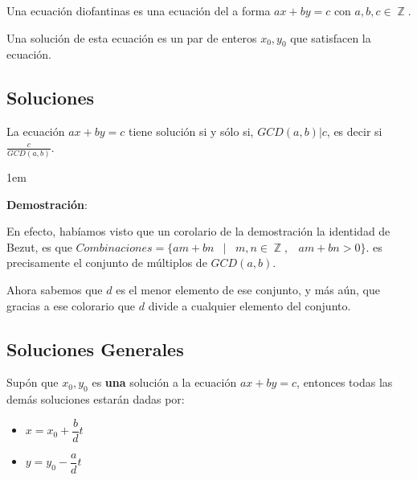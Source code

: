 \documentclass[12pt]{report}                                    %
\newenvironment{SmallIndentation}[1][0.75em]                    %
    {\begin{adjustwidth}{#1}{}\begin{footnotesize}}                 %
    {\end{footnotesize}\end{adjustwidth}}                           %
\DeclareMathOperator \Space {\quad}                             %
\DeclareMathOperator \MiniSpace {\;}                            %
\newcommand \Such {\MiniSpace|\MiniSpace}                       %
\DeclareMathOperator \Integers  {\mathbb{Z}}                     %
\begin{document}
            Una ecuación diofantinas es una ecuación del a forma $ax+by=c$ con
            $a,b,c \in \Integers$.

            Una solución de esta ecuación es un par de enteros $x_0, y_0$
            que satisfacen la ecuación.


        \subsection{Soluciones}

            La ecuación $ax+by = c$ tiene solución si y sólo si, $GCD(a,b)|c$, es decir
            si $\frac{c}{GCD(a,b)}$.

            \begin{SmallIndentation}[1em]
                \textbf{Demostración}:

                En efecto, habíamos visto que un corolario de la demostración la identidad
                de Bezut, es que
                $Combinaciones = \{ am+bn \Such m, n \in \Integers, \MiniSpace am+bn > 0 \}$.
                es precisamente el conjunto de múltiplos de $GCD(a,b)$.

                Ahora sabemos que $d$ es el menor elemento de ese conjunto, y más aún,
                que gracias a ese colorario que $d$ divide a cualquier elemento del conjunto.

            \end{SmallIndentation}


        \clearpage
        \subsection{Soluciones Generales}

            Supón que $x_0, y_0$ es \textbf{una} solución a la ecuación $ax+ by = c$,
            entonces todas las demás soluciones estarán dadas por:

            \begin{itemize}
                \item $x = x_0 + \dfrac{b}{d}t$
                \item $y = y_0 - \dfrac{a}{d}t$
            \end{itemize}
\end{document}
